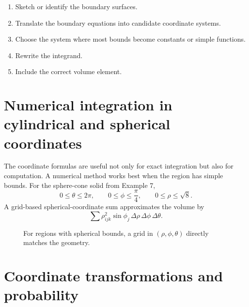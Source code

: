 \documentclass[11pt,oneside]{book}
\begin{document}
\begin{workflowbox}
\begin{enumerate}
  \item Sketch or identify the boundary surfaces.
  \item Translate the boundary equations into candidate coordinate systems.
  \item Choose the system where most bounds become constants or simple functions.
  \item Rewrite the integrand.
  \item Include the correct volume element.
\end{enumerate}
\end{workflowbox}

\section{Numerical integration in cylindrical and spherical coordinates}

The coordinate formulas are useful not only for exact integration but also for computation. A numerical method works best when the region has simple bounds. For the sphere-cone solid from Example 7,
\[
0\le \theta\le 2\pi,\qquad 0\le \phi\le \frac{\pi}{4},\qquad 0\le \rho\le \sqrt8.
\]
A grid-based spherical-coordinate sum approximates the volume by
\[
\sum \rho_{ijk}^2\sin\phi_j\,\Delta\rho\,\Delta\phi\,\Delta\theta.
\]

\begin{figure}[H]
\centering
{}
\caption{For regions with spherical bounds, a grid in $(\rho,\phi,\theta)$ directly matches the geometry.}
\end{figure}

\section{Coordinate transformations and probability}
\end{document}
